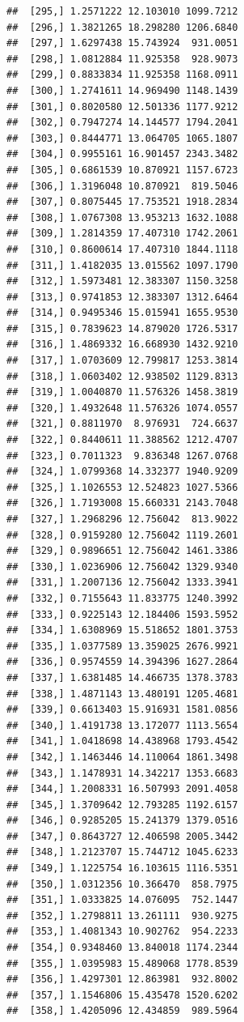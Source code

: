 \documentclass[article]{jss}\usepackage[]{graphicx}\usepackage[]{xcolor}
\makeatletter
\newenvironment{kframe}{%
 \def\at@end@of@kframe{}%
 \ifinner\ifhmode%
  \def\at@end@of@kframe{\end{minipage}}%
  \begin{minipage}{\columnwidth}%
 \fi\fi%
 \def\FrameCommand##1{\hskip\@totalleftmargin \hskip-\fboxsep
 \colorbox{shadecolor}{##1}\hskip-\fboxsep
     \hskip-\linewidth \hskip-\@totalleftmargin \hskip\columnwidth}%
 \MakeFramed {\advance\hsize-\width
   \@totalleftmargin\z@ \linewidth\hsize
   \@setminipage}}%
 {\par\unskip\endMakeFramed%
 \at@end@of@kframe}
\newenvironment{knitrout}{}{} %
\makeatother
\begin{document}
\begin{knitrout}
\begin{kframe}
\begin{verbatim}
##  [295,] 1.2571222 12.103010 1099.7212
##  [296,] 1.3821265 18.298280 1206.6840
##  [297,] 1.6297438 15.743924  931.0051
##  [298,] 1.0812884 11.925358  928.9073
##  [299,] 0.8833834 11.925358 1168.0911
##  [300,] 1.2741611 14.969490 1148.1439
##  [301,] 0.8020580 12.501336 1177.9212
##  [302,] 0.7947274 14.144577 1794.2041
##  [303,] 0.8444771 13.064705 1065.1807
##  [304,] 0.9955161 16.901457 2343.3482
##  [305,] 0.6861539 10.870921 1157.6723
##  [306,] 1.3196048 10.870921  819.5046
##  [307,] 0.8075445 17.753521 1918.2834
##  [308,] 1.0767308 13.953213 1632.1088
##  [309,] 1.2814359 17.407310 1742.2061
##  [310,] 0.8600614 17.407310 1844.1118
##  [311,] 1.4182035 13.015562 1097.1790
##  [312,] 1.5973481 12.383307 1150.3258
##  [313,] 0.9741853 12.383307 1312.6464
##  [314,] 0.9495346 15.015941 1655.9530
##  [315,] 0.7839623 14.879020 1726.5317
##  [316,] 1.4869332 16.668930 1432.9210
##  [317,] 1.0703609 12.799817 1253.3814
##  [318,] 1.0603402 12.938502 1129.8313
##  [319,] 1.0040870 11.576326 1458.3819
##  [320,] 1.4932648 11.576326 1074.0557
##  [321,] 0.8811970  8.976931  724.6637
##  [322,] 0.8440611 11.388562 1212.4707
##  [323,] 0.7011323  9.836348 1267.0768
##  [324,] 1.0799368 14.332377 1940.9209
##  [325,] 1.1026553 12.524823 1027.5366
##  [326,] 1.7193008 15.660331 2143.7048
##  [327,] 1.2968296 12.756042  813.9022
##  [328,] 0.9159280 12.756042 1119.2601
##  [329,] 0.9896651 12.756042 1461.3386
##  [330,] 1.0236906 12.756042 1329.9340
##  [331,] 1.2007136 12.756042 1333.3941
##  [332,] 0.7155643 11.833775 1240.3992
##  [333,] 0.9225143 12.184406 1593.5952
##  [334,] 1.6308969 15.518652 1801.3753
##  [335,] 1.0377589 13.359025 2676.9921
##  [336,] 0.9574559 14.394396 1627.2864
##  [337,] 1.6381485 14.466735 1378.3783
##  [338,] 1.4871143 13.480191 1205.4681
##  [339,] 0.6613403 15.916931 1581.0856
##  [340,] 1.4191738 13.172077 1113.5654
##  [341,] 1.0418698 14.438968 1793.4542
##  [342,] 1.1463446 14.110064 1861.3498
##  [343,] 1.1478931 14.342217 1353.6683
##  [344,] 1.2008331 16.507993 2091.4058
##  [345,] 1.3709642 12.793285 1192.6157
##  [346,] 0.9285205 15.241379 1379.0516
##  [347,] 0.8643727 12.406598 2005.3442
##  [348,] 1.2123707 15.744712 1045.6233
##  [349,] 1.1225754 16.103615 1116.5351
##  [350,] 1.0312356 10.366470  858.7975
##  [351,] 1.0333825 14.076095  752.1447
##  [352,] 1.2798811 13.261111  930.9275
##  [353,] 1.4081343 10.902762  954.2233
##  [354,] 0.9348460 13.840018 1174.2344
##  [355,] 1.0395983 15.489068 1778.8539
##  [356,] 1.4297301 12.863981  932.8002
##  [357,] 1.1546806 15.435478 1520.6202
##  [358,] 1.4205096 12.434859  989.5964

\end{verbatim}
\end{kframe}
\end{knitrout}
\end{document}
